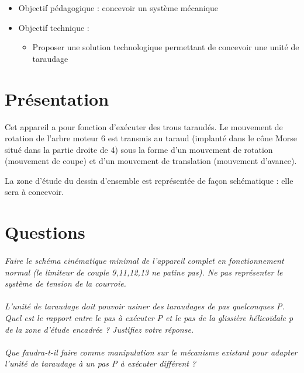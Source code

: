\documentclass[11pt,oneside]{article}
\begin{document}
\begin{contexte}
\begin{itemize}
\item Objectif pédagogique : concevoir un système mécanique
\item Objectif technique : 
\begin{itemize}
\item Proposer une solution technologique permettant de concevoir une unité de taraudage
\end{itemize}
\end{itemize}
\end{contexte}

\section*{Présentation}

Cet appareil a pour fonction d'exécuter des trous taraudés. Le mouvement de rotation de l'arbre moteur 6 est transmis au taraud (implanté dans le cône Morse situé dans la partie droite de 4) sous la forme d'un mouvement de rotation (mouvement de coupe) et d'un mouvement de translation (mouvement d'avance).

La zone d'étude du dessin d'ensemble est représentée de façon schématique : elle sera à concevoir.

\section*{Questions}

\paragraph{}
\textit{Faire le schéma cinématique minimal de l'appareil complet en fonctionnement normal (le limiteur de couple 9,11,12,13 ne patine pas). Ne pas représenter le système de tension de la courroie.}

\paragraph{}
\textit{L'unité de taraudage doit pouvoir usiner des taraudages de pas quelconques P. Quel est le rapport entre le pas à exécuter P et le pas de la glissière hélicoïdale p de la zone d'étude encadrée ? Justifiez votre réponse.}

\paragraph{}
\textit{Que faudra-t-il faire comme manipulation sur le mécanisme existant pour adapter l'unité de taraudage à un pas P à exécuter différent ?}
\end{document}
